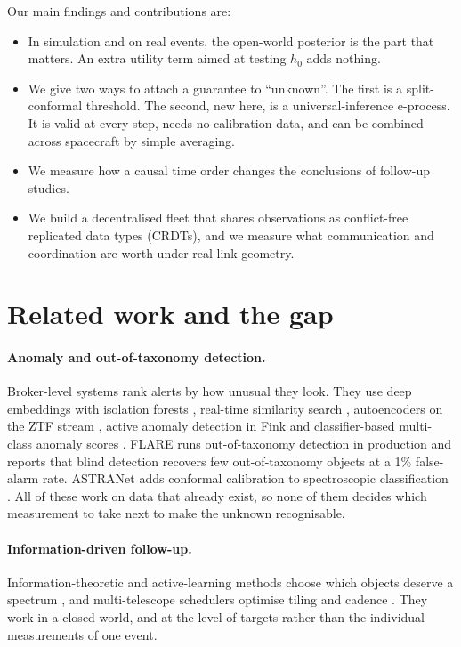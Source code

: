 \documentclass{jaa}
\begin{document}
Our main findings and contributions are:
\begin{itemize}
\item In simulation and on real events, the open-world posterior is the part that matters. An extra utility term aimed at testing $h_0$ adds nothing.
\item We give two ways to attach a guarantee to ``unknown''. The first is a split-conformal threshold. The second, new here, is a universal-inference e-process. It is valid at every step, needs no calibration data, and can be combined across spacecraft by simple averaging.
\item We measure how a causal time order changes the conclusions of follow-up studies.
\item We build a decentralised fleet that shares observations as conflict-free replicated data types (CRDTs), and we measure what communication and coordination are worth under real link geometry.
\end{itemize}

\section{Related work and the gap}\label{sec:related}

\paragraph{Anomaly and out-of-taxonomy detection.} Broker-level systems rank alerts by how unusual they look. They use deep embeddings with isolation forests \citep{Villar2021}, real-time similarity search \citep{Aleo2024}, autoencoders on the ZTF stream \citep{Iskandarli2026}, active anomaly detection in Fink \citep{Pruzhinskaya2026} and classifier-based multi-class anomaly scores \citep{Gupta2024}. FLARE runs out-of-taxonomy detection in production \citep{Sasli2026FLARE} and reports that blind detection recovers few out-of-taxonomy objects at a 1\% false-alarm rate. ASTRANet adds conformal calibration to spectroscopic classification \citep{Sasli2026ASTRANet}. All of these work on data that already exist, so none of them decides which measurement to take next to make the unknown recognisable.

\paragraph{Information-driven follow-up.} Information-theoretic and active-learning methods choose which objects deserve a spectrum \citep{Astudillo2020,Kennamer2020,Moller2025}, and multi-telescope schedulers optimise tiling and cadence \citep{Coughlin2019,Almualla2021}. They work in a closed world, and at the level of targets rather than the individual measurements of one event.
\end{document}
